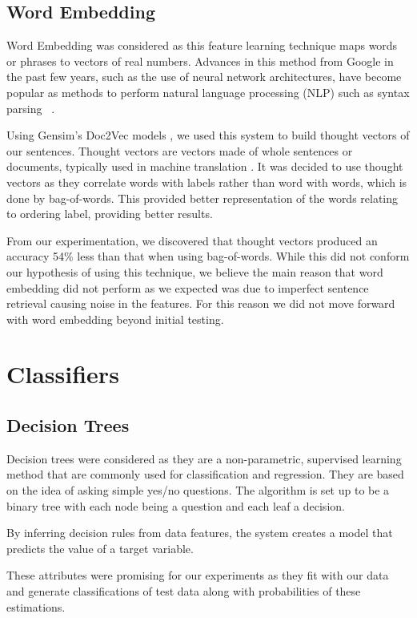 \documentclass[bsc,frontabs,twoside,singlespacing,parskip,deptreport]{infthesis}     %
\begin{document}
\subsection{Word Embedding}\label{sec:word-embedding}
Word Embedding was considered as this feature learning technique maps words or phrases to vectors of real numbers.
Advances in this method from Google in the past few years, such as the use of neural network architectures, have become
popular as methods to perform natural language processing (NLP) such as syntax parsing ~\cite{socher2013parsing}.

Using Gensim's Doc2Vec models \cite{rehurek_lrec}, we used this system to build thought vectors of our sentences.
Thought vectors are vectors made of whole sentences or documents, typically used in machine translation \cite{deeplearning4j}.
It was decided to use thought vectors as they correlate words with labels rather than word with words, which is done by bag-of-words.
This provided better representation of the words relating to ordering label, providing better results.



From our experimentation, we discovered that thought vectors produced an accuracy 54\% less than that when
using bag-of-words. While this did not conform our hypothesis of using this technique, we believe
the main reason that word embedding did not perform as we expected was due to imperfect sentence retrieval causing noise in
the features. For this reason we did not move forward with word embedding beyond initial testing.

\section{Classifiers}\label{sec:classifiers}
\subsection{Decision Trees}
Decision trees were considered as they are a non-parametric, supervised learning method that are commonly used for
classification and regression.
They are based on the idea of asking simple yes/no questions. The algorithm is set up to be a binary tree with
each node being a question and each leaf a decision.

By inferring decision rules from data features, the system creates a model that predicts the value of a target variable.

These attributes were promising for our experiments as they fit with our data and generate
classifications of test data along with probabilities of these estimations.
\end{document}
